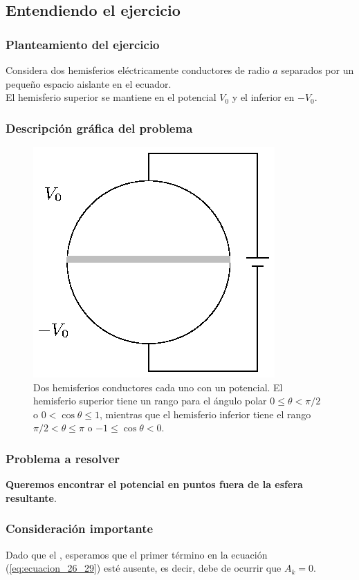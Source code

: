 \documentclass[12pt]{beamer}
\begin{document}
\subsection{Entendiendo el ejercicio}

\begin{frame}
\frametitle{Planteamiento del ejercicio}
Considera dos hemisferios eléctricamente conductores de radio $a$ separados por un pequeño espacio aislante en el ecuador. 
\\
\bigskip
\pause
El hemisferio superior se mantiene en el potencial $V_{0}$ y el inferior en $-V_{0}$.
\end{frame}
\begin{frame}
\frametitle{Descripción gráfica del problema}
\begin{figure}[H]
    \centering
    \includegraphics[scale=1]{Imagenes/Ejemplo_Esfera_03.eps}
    \caption{Dos hemisferios conductores cada uno con un potencial. El hemisferio superior tiene un rango para el ángulo polar $0 \leq \theta < \pi/2$ o $0 < \cos \theta \leq 1$, mientras que el hemisferio inferior tiene el rango $\pi/2 < \theta \leq \pi $ o $-1 \leq \cos \theta < 0$.}
    \label{fig_figura_esfera_03}
\end{figure}
\end{frame}
\begin{frame}
\frametitle{Problema a resolver}
\textbf{Queremos encontrar el potencial en puntos fuera de la esfera resultante}.
\end{frame}
\begin{frame}
\frametitle{Consideración importante}
Dado que el , \pause esperamos que el primer término en la ecuación (\ref{eq:ecuacion_26_29}) esté ausente, \pause es decir, debe de ocurrir que $A_{k} = 0$.
\end{frame}
\end{document}
